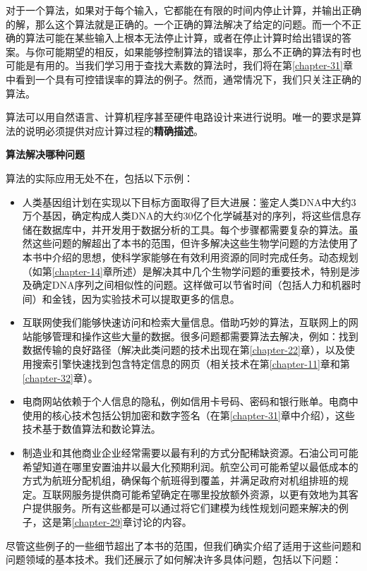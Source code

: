 \documentclass[lang=cn,newtx,10pt,scheme=chinese]{elegantbook}
\begin{document}
对于一个算法，如果对于每个输入，它都能在有限的时间内停止计算，并输出正确的解，那么这个算法就是正确的。一个正确的算法解决了给定的问题。而一个不正确的算法可能在某些输入上根本无法停止计算，或者在停止计算时给出错误的答案。与你可能期望的相反，如果能够控制算法的错误率，那么不正确的算法有时也可能是有用的。当我们学习用于查找大素数的算法时，我们将在第\ref{chapter-31}章中看到一个具有可控错误率的算法的例子。然而，通常情况下，我们只关注正确的算法。

算法可以用自然语言、计算机程序甚至硬件电路设计来进行说明。唯一的要求是算法的说明必须提供对应计算过程的\textbf{精确描述}。

\textbf{算法解决哪种问题}

算法的实际应用无处不在，包括以下示例：

\begin{itemize}
    \item 人类基因组计划在实现以下目标方面取得了巨大进展：鉴定人类DNA中大约3万个基因，确定构成人类DNA的大约30亿个化学碱基对的序列，将这些信息存储在数据库中，并开发用于数据分析的工具。每个步骤都需要复杂的算法。虽然这些问题的解超出了本书的范围，但许多解决这些生物学问题的方法使用了本书中介绍的思想，使科学家能够在有效利用资源的同时完成任务。动态规划（如第\ref{chapter-14}章所述）是解决其中几个生物学问题的重要技术，特别是涉及确定DNA序列之间相似性的问题。这样做可以节省时间（包括人力和机器时间）和金钱，因为实验技术可以提取更多的信息。
    \item 互联网使我们能够快速访问和检索大量信息。借助巧妙的算法，互联网上的网站能够管理和操作这些大量的数据。很多问题都需要算法去解决，例如：找到数据传输的良好路径（解决此类问题的技术出现在第\ref{chapter-22}章），以及使用搜索引擎快速找到包含特定信息的网页（相关技术在第\ref{chapter-11}章和第\ref{chapter-32}章）。
    \item 电商网站依赖于个人信息的隐私，例如信用卡号码、密码和银行账单。电商中使用的核心技术包括公钥加密和数字签名（在第\ref{chapter-31}章中介绍），这些技术基于数值算法和数论算法。
    \item 制造业和其他商业企业经常需要以最有利的方式分配稀缺资源。石油公司可能希望知道在哪里安置油井以最大化预期利润。航空公司可能希望以最低成本的方式为航班分配机组，确保每个航班得到覆盖，并满足政府对机组排班的规定。互联网服务提供商可能希望确定在哪里投放额外资源，以更有效地为其客户提供服务。所有这些都是可以通过将它们建模为线性规划问题来解决的例子，这是第\ref{chapter-29}章讨论的内容。
\end{itemize}

尽管这些例子的一些细节超出了本书的范围，但我们确实介绍了适用于这些问题和问题领域的基本技术。我们还展示了如何解决许多具体问题，包括以下问题：
\end{document}
